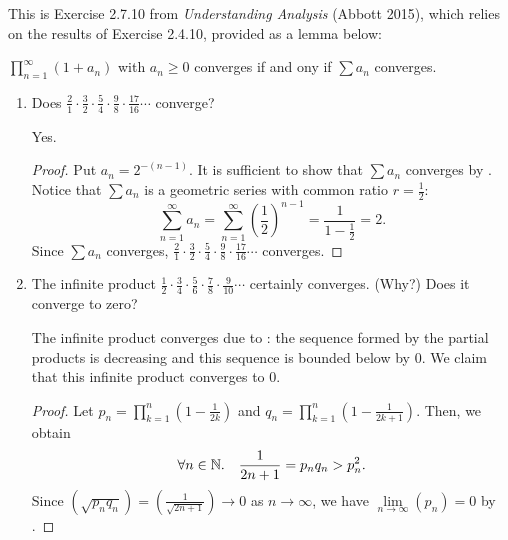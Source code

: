 \begin{problem}
  \leavevmode\par\noindent

  \begin{callout}
    This is Exercise 2.7.10 from \textit{Understanding Analysis} (Abbott 2015), which relies on the results
    of Exercise 2.4.10, provided as a lemma below:

    \begin{lemma}
      \label{lem:2.4.10}
      $\prod_{n=1}^{\infty} (1 + a_{n})$ with $a_{n} \geq 0$ converges if and ony if $\sum a_{n}$ converges.
    \end{lemma}

  \end{callout}

  \begin{enumerate}[label=(\alph*)]
    \item Does $\frac{2}{1} \cdot \frac{3}{2} \cdot \frac{5}{4} \cdot \frac{9}{8} \cdot \frac{17}{16} \cdots$ converge?
      \vspace{\baselineskip}

      Yes.

      \begin{proof}
        Put $a_{n} = 2^{-(n-1)}$. It is sufficient to show that $\sum a_{n}$ converges by . 
        Notice that $\sum a_{n}$ is a geometric series with common ratio $r = \frac{1}{2}$:
        \[
          \sum_{n=1}^{\infty} a_{n} = \sum_{n=1}^{\infty} \left( \frac{1}{2} \right)^{n-1} = \frac{1}{1 - \frac{1}{2}} = 2.
        \]
        Since $\sum a_{n}$ converges, $\frac{2}{1} \cdot \frac{3}{2} \cdot \frac{5}{4} \cdot \frac{9}{8} \cdot \frac{17}{16} \cdots$ converges.
      \end{proof}

    \item The infinite product $\frac{1}{2} \cdot \frac{3}{4} \cdot \frac{5}{6} \cdot \frac{7}{8} \cdot \frac{9}{10} \cdots$ certainly converges. (Why?) Does it converge to zero?
      \vspace{\baselineskip}

      The infinite product converges due to :
      the sequence formed by the partial products is decreasing and this
      sequence is bounded below by $0$. We claim that this infinite product converges to $0$.

      \begin{proof}
        Let $p_{n} = \prod_{k=1}^{n} \left(1 - \frac{1}{2k}\right)$ and $q_{n} = \prod_{k=1}^{n} \left(1 - \frac{1}{2k+1}\right)$.
        Then, we obtain
        \[
          \forall n \in \mathbb{N}. \quad \frac{1}{2n + 1} = p_{n}q_{n} > p_{n}^{2}.
        \]
        Since $\left(\sqrt{ p_{n} q_{n} }\right) = \left( \frac{1}{\sqrt{2n + 1}} \right) \to 0$ as $n \to \infty$, we have 
        $\lim\limits_{n \to \infty} (p_{n}) = 0$ by .
      \end{proof}



\end{enumerate}
\end{problem}
